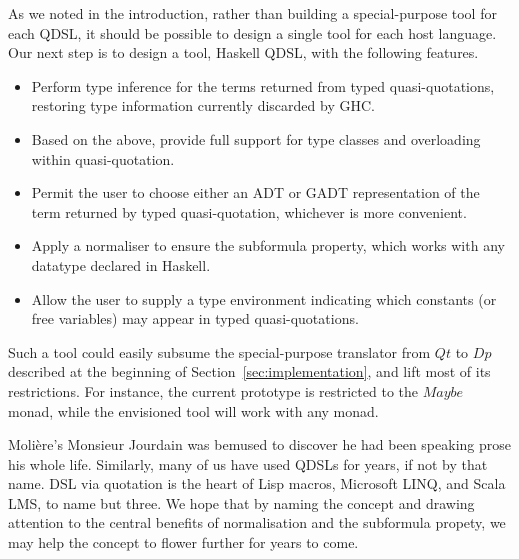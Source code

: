 \documentclass[authoryear,9pt]{sigplanconf}
\newcommand{\Conid}[1]{\mathit{#1}}
\begin{document}
As we noted in the introduction, rather than building a special-purpose tool for
each QDSL, it should be possible to design a single tool for each host language.
Our next step is to design a tool, Haskell QDSL, with the following features.
\begin{itemize}
\item Perform type inference for the terms returned from typed
  quasi-quotations, restoring type information currently discarded by GHC.
\item Based on the above, provide full support for type classes
  and overloading within quasi-quotation.
\item Permit the user to choose either an ADT or GADT representation of the
  term returned by typed quasi-quotation, whichever is more convenient.
\item Apply a normaliser to ensure the subformula property,
  which works with any datatype declared in Haskell.
\item Allow the user to supply a type environment indicating which constants
  (or free variables) may appear in typed quasi-quotations.
\end{itemize}
Such a tool could easily subsume the special-purpose translator from
\ensuremath{\Conid{Qt}} to \ensuremath{\Conid{Dp}} described at the beginning of Section~\ref{sec:implementation},
and lift most of its restrictions. For instance,
the current prototype is restricted to the \ensuremath{\Conid{Maybe}} monad, while the
envisioned tool will work with any monad.


Moli\`{e}re's Monsieur Jourdain was bemused to discover he had been
speaking prose his whole life. Similarly, many of us have used QDSLs for
years, if not by that name. DSL via quotation is the heart of Lisp
macros, Microsoft LINQ, and Scala LMS, to name but three. We hope that
by naming the concept and drawing attention to the central benefits of
normalisation and the subformula propety, we may help the concept to
flower further for years to come.

\end{document}
